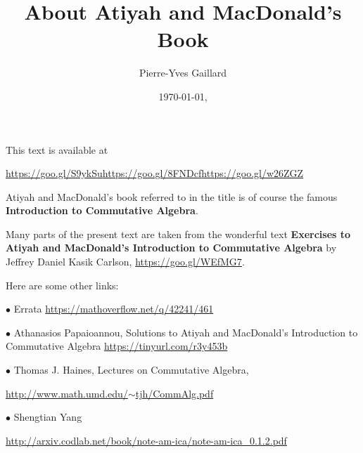 \documentclass[parskip=half,fontsize=12pt]{scrartcl}%
\title{About Atiyah and MacDonald's Book}
\author{Pierre-Yves Gaillard}
\date{\today,\currenttime}
\newcommand{\oo}{\operatorname}\newcommand{\ooo}{\operatorname*}
\newcommand{\bu}{\bullet}
\begin{document}


\maketitle\tableofcontents

This text is available at 

\href{http://www.iecl.univ-lorraine.fr/~Pierre-Yves.Gaillard/DIVERS/Atiyah_MacDonald_c/}{https://goo.gl/S9ykSu}\quad\href{https://github.com/Pierre-Yves-Gaillard/Atiyah_MacDonald_c/blob/master/Atiyah_MacDonald_c.tex}{https://goo.gl/8FNDcf}\quad\href{https://docs.google.com/document/d/1AW4qMXoarPW1L1Nxbgy4bODorWEpE6_Gdd35sFJKyew/edit?usp=sharing}{https://goo.gl/w26ZGZ}

Atiyah and MacDonald's book referred to in the title is of course the famous \textbf{Introduction to Commutative Algebra}.

Many parts of the present text are taken from the wonderful text \textbf{Exercises to Atiyah and MacDonald's Introduction to Commutative Algebra} by Jeffrey Daniel Kasik Carlson, \href{https://goo.gl/WEfMG7}{https://goo.gl/WEfMG7}.

Here are some other links:

$\bu$ Errata \href{https://mathoverflow.net/q/42241/461}{https://mathoverflow.net/q/42241/461}


$\bu$ Athanasios Papaioannou, Solutions to Atiyah and MacDonald’s Introduction to Commutative Algebra \href{https://tinyurl.com/r3y453b}{https://tinyurl.com/r3y453b}


$\bu$ Thomas J. Haines, Lectures on Commutative Algebra, 

\href{http://www.math.umd.edu/~tjh/CommAlg.pdf}{http://www.math.umd.edu/$\sim$tjh/CommAlg.pdf}

$\bu$ Shengtian Yang 

\href{http://arxiv.codlab.net/book/note-am-ica/note-am-ica_0.1.2.pdf}{\small http://arxiv.codlab.net/book/note-am-ica/note-am-ica\_0.1.2.pdf}
\end{document}
